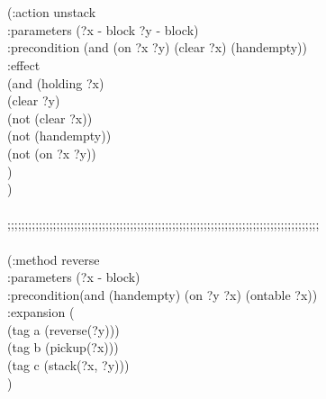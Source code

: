 \begin{appendix}
\\ \hspace*{1.5cm}		   
\\ \hspace*{1.5cm}  (:action unstack
\\ \hspace*{2cm}	     :parameters (?x - block ?y - block)
\\ \hspace*{2cm}	     :precondition (and (on ?x ?y) (clear ?x) (handempty))
\\ \hspace*{2cm}	     :effect
\\ \hspace*{2cm}	     (and (holding ?x)
\\ \hspace*{2.5cm}		   (clear ?y)
\\ \hspace*{2.5cm}		   (not (clear ?x))
\\ \hspace*{2.5cm}		   (not (handempty))
\\ \hspace*{2.5cm}		   (not (on ?x ?y))
\\ \hspace*{2cm})
\\ \hspace*{1.5cm})
\\
\\;;;;;;;;;;;;;;;;;;;;;;;;;;;;;;;;;;;;;;;;;;;;;;;;;;;;;;;;;;;;;;;;;;;;;;;;;;;;;;;;;;;;;;;;;
\\
\\ \hspace*{1.5cm}(:method reverse\\
\hspace*{2cm}  :parameters  (?x - block)\\
\hspace*{2cm}  :precondition(and (handempty) (on ?y ?x) (ontable ?x))\\
\hspace*{2cm}  :expansion  (\\
\hspace*{2.5cm}        (tag a (reverse(?y)))\\
\hspace*{2.5cm}        (tag b (pickup(?x)))\\
\hspace*{2.5cm}        (tag c (stack(?x, ?y)))\\
\hspace*{2cm}  )\\

\end{appendix}

